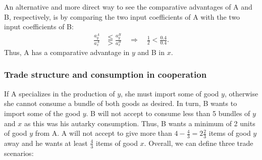 {An alternative and more direct way to see the comparative advantages of A and B, respectively, is by comparing the two input coefficients of A with the two input coefficients of B: 
	\begin{align*}
		\frac{a^A_y}{a^A_x} &\lesseqqgtr \frac{a^B_y}{a^B_x} \quad	\Rightarrow \quad \frac{1}{2} <\frac{0.4}{0.4}.
	\end{align*}
Thus, A has a comparative advantage in $y$ and B in $x$.




\subsubsection{Trade structure and consumption in cooperation}
If A specializes in the production of $y$, she must import some of good $y$, otherwise she cannot consume a bundle of both goods as desired. In turn, B wants to import some of the good $y$. 
B will not accept to consume less than 5 bundles of $y$ and $x$ as this was his autarky consumption. Thus, B wants a minimum of 2 units of good $y$ from A. A will not accept to give more than $4-\frac{4}{3}=2\frac{2}{3}$ items of good $y$ away and he wants at least $\frac{4}{3}$ items of good $x$. Overall, we can define three trade scenarios:

}

